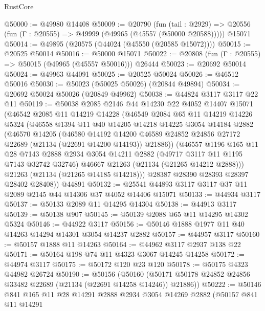 \begin{lexlean}{RustCore}
\begin{coremodule}
@50000 := @49980 @14408
@50009 := @20790
    (fun (tail : @2929) => @20556 (fun (Γ : @20555) => @49999 (@49965 (@45557 (@50000 @20588)))))
    @15071
@50014 := @49895 (@20575 (@44024 (@45550 (@20585 @15072))))
@50015 := @20525 @50014
@50016 := @50000 @15071
@50022 := @20808 (fun (Γ : @20555) => @50015 (@49965 (@45557 @50016))) @26444
@50023 := @20692 @50014
@50024 := @49963 @44091
@50025 := @20525 @50024
@50026 := @46512 @50016
@50030 := @50023 (@50025 @50026) (@20844 @49894)
@50034 := @20692 @50024 @50026 (@20849 @49962)
@50038 := @44824 @3117 @3117 @22 @11
@50119 := @50038
    @2085
    @2146
    @44
    @14230
    @22
    @4052
    @14407
    @15071
    (@46542
      @2085
      @11
      @14219
      @14228
      (@46549
        @2084
        @65
        @11
        @14219
        @14226
        @5324
        (@46558
          @1394
          @11
          @40
          @14205
          @14218
          @14225
          @3054
          @14184
          @2882
          (@46570
            @14205
            (@46580
              @14192
              @14200
              @46589
              @24852
              @24856
              @27172
              @22689
              (@21134 (@22691 @14200 @14193))
              @21886))
          (@46557
            @1196
            @165
            @11
            @28
            @7143
            @2888
            @2934
            @3054
            @14211
            @2882
            (@49717 @3117 @11 @1195 @7143 @32742 @32746)
            @46667
            @21263
            (@21134 (@21265 @14212 @2888)))
          @21263
          (@21134 (@21265 @14185 @14218)))
        @28387
        @28390
        @28393
        @28397
        @28402
        @28408))
    @44891
@50132 := @25541 @44893 @3117 @3117 @37 @11 @2089 @2145 @44 @14306 @37 @4052 @14406 @15071
@50133 := @44934 @3117
@50137 := @50133 @2089 @11 @14295 @14304
@50138 := @44913 @3117
@50139 := @50138 @907
@50145 := @50139 @2088 @65 @11 @14295 @14302 @5324
@50146 := @44922 @3117
@50156 := @50146 @1888 @1977 @11 @40 @14263 @14294 @14301 @3054 @14237 @2882
@50157 := @44957 @3117
@50160 := @50157 @1888 @11 @14263
@50164 := @44962 @3117 @2937 @138 @22
@50171 := @50164 @198 @74 @11 @4323 @3067 @14245 @14258
@50172 := @44974 @3117
@50175 := @50172 @120 @23 @120
@50178 := @50175 @4323 @44982 @26724
@50190 := @50156
    (@50160 (@50171 @50178 @24852 @24856 @33482 @22689 (@21134 (@22691 @14258 @14246)) @21886))
@50222 := @50146
    @841
    @165
    @11
    @28
    @14291
    @2888
    @2934
    @3054
    @14269
    @2882
    (@50157
      @841
      @11
      @14291

\end{coremodule}
\end{lexlean}
